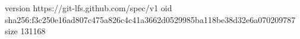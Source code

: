 version https://git-lfs.github.com/spec/v1
oid sha256:f3c250e16ad807c475a826c4c41a3662d0529985ba118be38d32e6a070209787
size 131168
